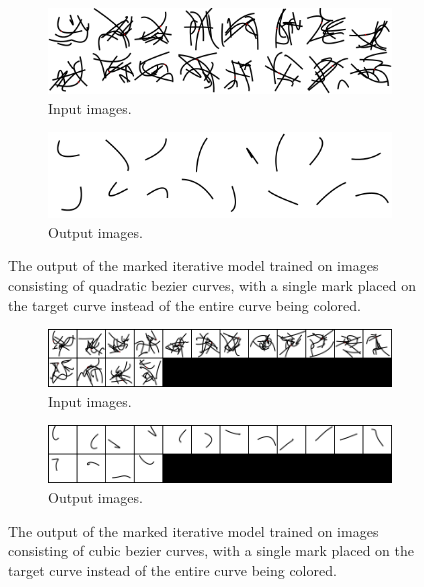 \begin{figure}
    \centering
    \begin{subfigure}{.45\textwidth}
        \includegraphics[width=\textwidth]{graphics/work-artifacts/marked/local/102/input.png}
        \caption{Input images.}
    \end{subfigure}
    \begin{subfigure}{.45\textwidth}
        \includegraphics[width=\textwidth]{graphics/work-artifacts/marked/local/102/recons.png}
        \caption{Output images.}
    \end{subfigure}
    \caption{The output of the marked iterative model trained on images consisting of quadratic bezier curves, with a single mark placed on the target curve instead of the entire curve being colored.}
    \label{fig:marked.local.102.recons}
\end{figure}

\begin{figure}
    \centering
    \begin{subfigure}{.45\textwidth}
        \includegraphics[width=\textwidth]{graphics/work-artifacts/marked/server/107/real_img_20773.png}
        \caption{Input images.}
    \end{subfigure}
    \begin{subfigure}{.45\textwidth}
        \includegraphics[width=\textwidth]{graphics/work-artifacts/marked/server/107/recons_20773.png}
        \caption{Output images.}
    \end{subfigure}
    \caption{The output of the marked iterative model trained on images consisting of cubic bezier curves, with a single mark placed on the target curve instead of the entire curve being colored.}
    \label{fig:marked.local.107.recons}
\end{figure}

